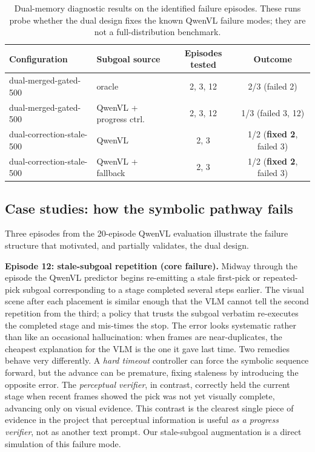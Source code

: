 \documentclass{article}
\begin{document}
\begin{table}[t]
  \centering
  \caption{Dual-memory diagnostic results on the identified failure episodes. These runs probe whether the dual design fixes the known QwenVL failure modes; they are not a full-distribution benchmark.}
  \label{tab:dualresults}
  \small
  \begin{tabular}{llcc}
    \toprule
    Configuration & Subgoal source & Episodes tested & Outcome \\
    \midrule
    dual-merged-gated-500 & oracle & 2, 3, 12 & 2/3 (failed 2) \\
    dual-merged-gated-500 & QwenVL + progress ctrl. & 2, 3, 12 & 1/3 (failed 3, 12) \\
    dual-correction-stale-500 & QwenVL & 2, 3 & 1/2 (\textbf{fixed 2}, failed 3) \\
    dual-correction-stale-500 & QwenVL + fallback & 2, 3 & 1/2 (\textbf{fixed 2}, failed 3) \\
    \bottomrule
  \end{tabular}
\end{table}

\subsection{Case studies: how the symbolic pathway fails}
\label{sec:exp-cases}

Three episodes from the 20-episode QwenVL evaluation illustrate the failure structure that motivated, and partially validates, the dual design.

\textbf{Episode 12: stale-subgoal repetition (core failure).} Midway through the episode the QwenVL predictor begins re-emitting a stale first-pick or repeated-pick subgoal corresponding to a stage completed several steps earlier. The visual scene after each placement is similar enough that the VLM cannot tell the second repetition from the third; a policy that trusts the subgoal verbatim re-executes the completed stage and mis-times the stop. The error looks systematic rather than like an occasional hallucination: when frames are near-duplicates, the cheapest explanation for the VLM is the one it gave last time. Two remedies behave very differently. A \emph{hard timeout} controller can force the symbolic sequence forward, but the advance can be premature, fixing staleness by introducing the opposite error. The \emph{perceptual verifier}, in contrast, correctly held the current stage when recent frames showed the pick was not yet visually complete, advancing only on visual evidence. This contrast is the clearest single piece of evidence in the project that perceptual information is useful \emph{as a progress verifier}, not as another text prompt. Our stale-subgoal augmentation is a direct simulation of this failure mode.
\end{document}

